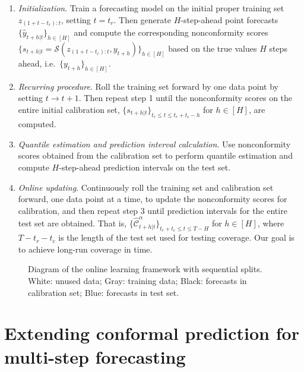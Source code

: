 \documentclass[
  11pt,
  12pt]{article}
\theoremstyle{plain}
\theoremstyle{remark}
\begin{document}
\begin{enumerate}
\def\labelenumi{\arabic{enumi}.}
\item
  \emph{Initialization}. Train a forecasting model on the initial proper
  training set \(z_{(1+t-t_r):t}\), setting \(t=t_r\). Then generate
  \(H\)-step-ahead point forecasts \(\{\hat{y}_{t+h|t}\}_{h\in[H]}\) and
  compute the corresponding nonconformity scores
  \(\{s_{t+h|t}=\mathcal{S}(z_{(1+t-t_r):t}, y_{t+h})\}_{h\in[H]}\)
  based on the true values \(H\) steps ahead,
  i.e.~\(\{y_{t+h}\}_{h\in[H]}\).
\item
  \emph{Recurring procedure}. Roll the training set forward by one data
  point by setting \(t \rightarrow t+1\). Then repeat step 1 until the
  nonconformity scores on the entire initial calibration set,
  \(\{s_{t+h|t}\}_{t_r \leq t \leq t_r+t_c-h}\) for \(h\in[H]\), are
  computed.
\item
  \emph{Quantile estimation and prediction interval calculation}. Use
  nonconformity scores obtained from the calibration set to perform
  quantile estimation and compute \(H\)-step-ahead prediction intervals
  on the test set.
\item
  \emph{Online updating}. Continuously roll the training set and
  calibration set forward, one data point at a time, to update the
  nonconformity scores for calibration, and then repeat step 3 until
  prediction intervals for the entire test set are obtained. That is,
  \(\{\hat{\mathcal{C}}_{t+h|t}^{\alpha}\}_{t_r+t_c \leq t \leq T-H}\)
  for \(h \in [H]\), where \(T-t_r-t_c\) is the length of the test set
  used for testing coverage. Our goal is to achieve long-run coverage in
  time.
\end{enumerate}

\begin{figure}[!hbtp]
\vspace*{-1.5cm}
\hspace*{-2.5cm}

\vspace*{-1.0cm}

\caption{Diagram of the online learning framework with sequential splits. White: unused data; Gray: training data; Black: forecasts in calibration set; Blue: forecasts in test set.}\label{fig-flowchart}
\end{figure}

\section{Extending conformal prediction for multi-step
forecasting}\label{sec-ext}
\end{document}
